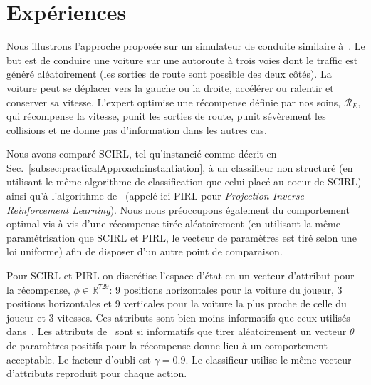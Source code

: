 \documentclass[english,utf8]{./hermes-journal}
\newcommand{\R}{\mathcal{R}}
\begin{document}
\section{Expériences}
\label{sec:experiments}

Nous illustrons l'approche proposée sur un simulateur de conduite similaire à~\cite{Abbeel:2004,Syed:2008:game}.  Le but est de conduire une voiture sur une autoroute à trois voies dont le traffic est généré aléatoirement (les sorties de route sont possible des deux côtés). La voiture peut se déplacer vers la gauche ou la droite, accélérer ou ralentir et conserver sa vitesse. L'expert optimise une récompense définie par nos soins, $\R_E$, qui récompense la vitesse, punit les sorties de route, punit sévèrement les collisions et ne donne pas d'information dans les autres cas.

Nous avons comparé SCIRL, tel qu'instancié comme décrit en
Sec.~\ref{subsec:practicalApproach:instantiation}, à un classifieur non structuré (en utilisant le même algorithme de classification que celui placé au coeur de SCIRL) ainsi qu'à l'algorithme de~\cite{Abbeel:2004} (appelé ici PIRL pour \emph{
Projection Inverse Reinforcement Learning}). Nous nous préoccupons également du comportement optimal vis-à-vis d'une récompense tirée aléatoirement (en utilisant la même paramétrisation que SCIRL et PIRL, le vecteur de paramètres est tiré selon une loi uniforme) afin de disposer d'un autre point de comparaison.

Pour SCIRL et PIRL on discrétise l'espace d'état en un vecteur d'attribut pour la récompense, $\phi\in\mathbb{R}^{729}$: $9$ positions horizontales pour la voiture du joueur, $3$ positions horizontales et $9$ verticales pour la voiture la plus proche de celle du joueur et $3$ vitesses. Ces attributs sont bien moins informatifs que ceux utilisés dans~\cite{Abbeel:2004,Syed:2008:game}. Les attributs de~\cite{Syed:2008:game} sont si informatifs que tirer aléatoirement un vecteur $\theta$ de paramètres positifs pour la récompense donne lieu à un comportement acceptable. Le facteur d'oubli est $\gamma = 0.9$. Le classifieur utilise le même vecteur d'attributs reproduit pour chaque action.
\end{document}
